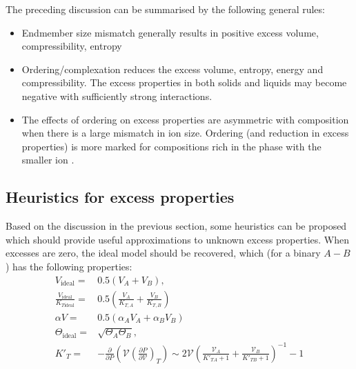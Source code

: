 The preceding discussion can be summarised by the following general rules:
\begin{itemize}
\item Endmember size mismatch generally results in positive excess volume, compressibility, entropy
\item Ordering/complexation reduces the excess volume, entropy, energy and compressibility. The excess properties in both solids and liquids may become negative with sufficiently strong interactions.
\item The effects of ordering on excess properties are asymmetric with composition when there is a large mismatch in ion size. Ordering (and reduction in excess properties) is more marked for compositions rich in the phase with the smaller ion \citep{NW1980}.
\end{itemize}

\subsection{Heuristics for excess properties}

Based on the discussion in the previous section, some heuristics can be proposed which should provide useful approximations to unknown excess properties. When excesses are zero, the ideal model should be recovered, which (for a binary $A-B$) has the following properties:
\begin{eqnarray}
V_{\textrm{ideal}} =& 0.5\left(V_A + V_B\right),\\
\frac{V_{\textrm{ideal}}}{K_{T\textrm{ideal}}} =& 0.5 \left( \frac{V_{A}}{K_{T, A}} + \frac{V_{B}}{K_{T, B}} \right) \\
\alpha V =& 0.5 \left( \alpha_A V_A + \alpha_B V_B \right) \\
\Theta_{\textrm{ideal}} =& \sqrt { \Theta_A \Theta_B }, \\
 K'_{T} =& -\frac{\partial}{\partial P} \left (\mathcal{V}\left( \frac{\partial P}{\partial \mathcal{V}} \right)_T \right) \sim 2 \mathcal{V} \left(\frac{\mathcal{V}_A}{K'_{TA} + 1} + \frac{\mathcal{V}_B}{K'_{TB} + 1}\right)^{-1} - 1
\end{eqnarray}

